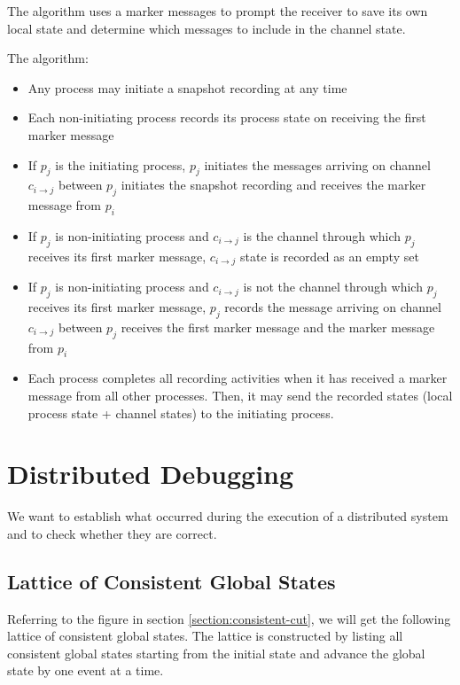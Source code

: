 \begin{multicols*}{2}
\noindent The algorithm uses a marker messages to prompt the receiver to save its own local state and determine which messages to include in the channel state.

\noindent The algorithm:

\begin{itemize}
  \item Any process may initiate a snapshot recording at any time
  \item Each non-initiating process records its process state on receiving the first marker message
  \item If $p_j$ is the initiating process, $p_j$ initiates the messages arriving on channel $c_{i\rightarrow j}$ between $p_j$ initiates the snapshot recording and receives the marker message from $p_i$
  \item If $p_j$ is non-initiating process and $c_{i\rightarrow j}$ is the channel through which $p_j$ receives its first marker message, $c_{i\rightarrow j}$ state is recorded as an empty set
  \item If $p_j$ is non-initiating process and $c_{i\rightarrow j}$ is not the channel through which $p_j$ receives its first marker message, $p_j$ records the message arriving on channel $c_{i\rightarrow j}$ between $p_j$ receives the first marker message and the marker message from $p_i$
  \item Each process completes all recording activities when it has received a marker message from all other processes. Then, it may send the recorded states (local process state + channel states) to the initiating process.
\end{itemize}

\section{Distributed Debugging}

\noindent We want to establish what occurred during the execution of a distributed system and to check whether they are correct.

\subsection{Lattice of Consistent Global States}

\noindent Referring to the figure in section \ref{section:consistent-cut}, we will get the following lattice of consistent global states. The lattice is constructed by listing all consistent global states starting from the initial state and advance the global state by one event at a time.


\end{multicols*}

